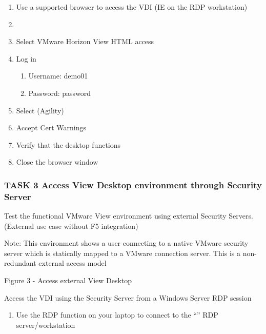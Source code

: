 \documentclass[letterpaper,10pt,english]{sphinxmanual}
\begin{document}
\begin{enumerate}
\item {} 
Use a supported browser to access the VDI (IE on the RDP
workstation)


\item {} 

\item {} 
Select VMware Horizon View HTML access

\item {} 
Log in
\begin{enumerate}
\item {} 
Username: demo01

\item {} 
Password: password

\end{enumerate}

\item {} 
Select (Agility)

\item {} 
Accept Cert Warnings

\item {} 
Verify that the desktop functions

\item {} 
Close the browser window

\end{enumerate}


\subsubsection{TASK 3 \textendash{} Access View Desktop environment through Security Server}
\label{\detokenize{class2/module1/lab1:task-3-access-view-desktop-environment-through-security-server}}
Test the functional VMware View environment using external Security
Servers. (External use case without F5 integration)

Note: This environment shows a user connecting to a native VMware
security server which is statically mapped to a VMware connection
server. This is a non-redundant external access model


Figure 3 - Access external View Desktop

Access the VDI using the Security Server from a Windows Server RDP
session
\begin{enumerate}
\item {} 
Use the RDP function on your laptop to connect to the
“” RDP server/workstation

\end{enumerate}
\end{document}
